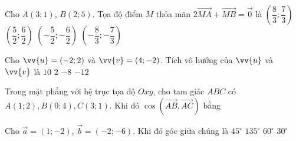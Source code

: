 \begin{ex}%
Cho $A(3;1)$, $B(2;5)$. Tọa độ điểm $M$ thỏa mãn $2 \overrightarrow{MA}+\overrightarrow{MB} = \overrightarrow{0}$ là
\choice
{\True $\left(\dfrac{8}{3};\dfrac{7}{3}\right)$}
{$\left(\dfrac{5}{2};\dfrac{6}{2}\right)$}
{$\left(-\dfrac{5}{2};-\dfrac{6}{2}\right)$}
{$\left(-\dfrac{8}{3};-\dfrac{7}{3}\right)$}
\end{ex}

\begin{ex}%
Cho $\vv{u}=(-2;2)$ và $\vv{v}=(4;-2)$. Tích vô hướng của $\vv{u}$ và $\vv{v}$ là
\choice
{$10$}
{$2$}
{$-8$}
{\True $-12$}
\end{ex}

\begin{ex}%
Trong mặt phẳng với hệ trục tọa độ $Oxy$, cho tam giác $ABC$ có $A(1;2), B(0;4), C(3;1)$. Khi đó $\cos (\overrightarrow{AB}, \overrightarrow{AC})$ bằng
\end{ex}

\begin{ex}%
Cho $\overrightarrow{a} = (1; -2)$, $\overrightarrow{b} = (-2; -6)$. Khi đó góc giữa chúng là
\choice
{\True $45^\circ$}
{$135^\circ$}
{$60^\circ$}
{$30^\circ$}
\end{ex}

